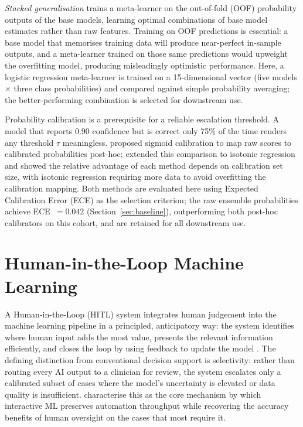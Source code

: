 \emph{Stacked generalisation} \citep{wolpert1992stacked} trains a meta-learner
on the out-of-fold (OOF) probability outputs of the base models, learning
optimal combinations of base model estimates rather than raw features. Training
on OOF predictions is essential: a base model that memorises training data will
produce near-perfect in-sample outputs, and a meta-learner trained on those same
predictions would upweight the overfitting model, producing misleadingly
optimistic performance. Here, a logistic regression meta-learner is trained on a
15-dimensional vector (five models $\times$ three class probabilities) and
compared against simple probability averaging; the better-performing combination
is selected for downstream use.

Probability calibration is a prerequisite for a reliable escalation threshold.
A model that reports 0.90 confidence but is correct only 75\% of the time
renders any threshold $\tau$ meaningless. \citet{platt1999probabilistic}
proposed sigmoid calibration to map raw scores to calibrated probabilities
post-hoc; \citet{niculescu2005predicting} extended this comparison to isotonic
regression and showed the relative advantage of each method depends on
calibration set size, with isotonic regression requiring more data to avoid
overfitting the calibration mapping. Both methods are evaluated here using
Expected Calibration Error (ECE) as the selection criterion; the raw ensemble
probabilities achieve ECE~$= 0.042$ (Section~\ref{sec:baseline}), outperforming
both post-hoc calibrators on this cohort, and are retained for all downstream
use.

\section{Human-in-the-Loop Machine Learning}
\label{sec:hitl}

A Human-in-the-Loop (HITL) system integrates human judgement into the machine
learning pipeline in a principled, anticipatory way: the system identifies where
human input adds the most value, presents the relevant information efficiently,
and closes the loop by using feedback to update the model
\citep{monarch2021hitl}. The defining distinction from conventional decision
support is selectivity: rather than routing every AI output to a clinician for
review, the system escalates only a calibrated subset of cases where the model's
uncertainty is elevated or data quality is insufficient.
\citet{amershi2014power} characterise this as the core mechanism by which
interactive ML preserves automation throughput while recovering the accuracy
benefits of human oversight on the cases that most require it.

